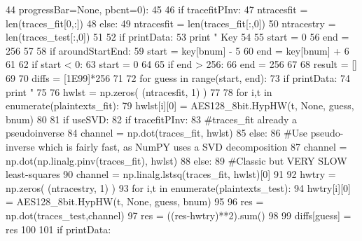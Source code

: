\begin{DoxyCode}
44                   progressBar=\textcolor{keywordtype}{None}, pbcnt=0):
45 
46         \textcolor{keywordflow}{if} tracefitPInv:
47             ntracesfit = len(traces\_fit[0,:])
48         \textcolor{keywordflow}{else}:
49             ntracesfit = len(traces\_fit[:,0])
50         ntracestry = len(traces\_test[:,0])
51 
52         \textcolor{keywordflow}{if} printData:
53             \textcolor{keywordflow}{print} \textcolor{stringliteral}{" Key %
54 
55         start = 0
56         end = 256
57 
58         \textcolor{keywordflow}{if} aroundStartEnd:
59             start = key[bnum] - 5
60             end = key[bnum] + 6
61 
62         \textcolor{keywordflow}{if} start < 0:
63             start = 0
64         
65         \textcolor{keywordflow}{if} end > 256:
66             end = 256
67 
68         result = []
69 
70         diffs = [1E99]*256
71 
72         \textcolor{keywordflow}{for} guess \textcolor{keywordflow}{in} range(start, end):
73             \textcolor{keywordflow}{if} printData:
74                 \textcolor{keywordflow}{print} \textcolor{stringliteral}{"  %
75                 
76             hwlst = np.zeros( (ntracesfit, 1) )
77 
78             \textcolor{keywordflow}{for} i,t \textcolor{keywordflow}{in} enumerate(plaintexts\_fit):
79                 hwlst[i][0] = AES128\_8bit.HypHW(t, \textcolor{keywordtype}{None}, guess, bnum)
80     
81             \textcolor{keywordflow}{if} useSVD:
82                 \textcolor{keywordflow}{if} tracefitPInv:
83                     \textcolor{comment}{#traces\_fit already a pseudoinverse}
84                     channel = np.dot(traces\_fit, hwlst)
85                 \textcolor{keywordflow}{else}:
86                     \textcolor{comment}{#Use pseudo-inverse which is fairly fast, as NumPY uses a SVD decomposition}
87                     channel = np.dot(np.linalg.pinv(traces\_fit), hwlst) 
88             \textcolor{keywordflow}{else}:
89                 \textcolor{comment}{#Classic but VERY SLOW least-squares}
90                 channel = np.linalg.lstsq(traces\_fit, hwlst)[0]           
91 
92             hwtry = np.zeros( (ntracestry, 1) )
93             \textcolor{keywordflow}{for} i,t \textcolor{keywordflow}{in} enumerate(plaintexts\_test):
94                 hwtry[i][0] = AES128\_8bit.HypHW(t, \textcolor{keywordtype}{None}, guess, bnum)
95 
96             res = np.dot(traces\_test,channel)
97             res = ((res-hwtry)**2).sum()   
98 
99             diffs[guess] = res
100 
101             \textcolor{keywordflow}{if} printData:
}}
\end{DoxyCode}
